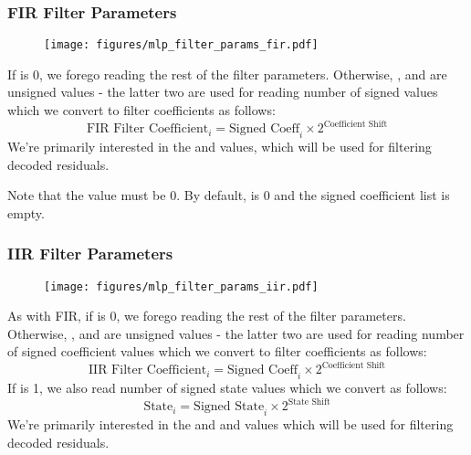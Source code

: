 \subsubsection{FIR Filter Parameters}
\begin{figure}[h!]
\texttt{[image: figures/mlp\_filter\_params\_fir.pdf]}
\end{figure}
\par
\noindent
If  is 0, we forego reading the rest of the filter parameters.
Otherwise, ,  and 
are unsigned values - the latter two are used for reading
 number of signed values
which we convert to filter coefficients as follows:
\begin{equation*}
\text{FIR Filter Coefficient}_i = \text{Signed Coeff}_i \times 2 ^ {\text{Coefficient Shift}}
\end{equation*}
We're primarily interested in the  and 
values, which will be used for filtering decoded residuals.

Note that the  value must be 0.  By default,
 is 0 and the signed coefficient list is empty.

\subsubsection{IIR Filter Parameters}
\begin{figure}[h]
\texttt{[image: figures/mlp\_filter\_params\_iir.pdf]}
\end{figure}

As with FIR, if  is 0, we forego reading the rest of the
filter parameters.
Otherwise, ,  and 
are unsigned values - the latter two are used for reading
 number of signed coefficient values
which we convert to filter coefficients as follows:
\begin{equation*}
\text{IIR Filter Coefficient}_i = \text{Signed Coeff}_i \times 2 ^ {\text{Coefficient Shift}}
\end{equation*}
If  is 1, we also read  number of signed state
values which we convert as follows:
\begin{equation*}
\text{State}_i = \text{Signed State}_i \times 2 ^ {\text{State Shift}}
\end{equation*}
We're primarily interested in the  and 
and  values which will be used for filtering decoded residuals.

